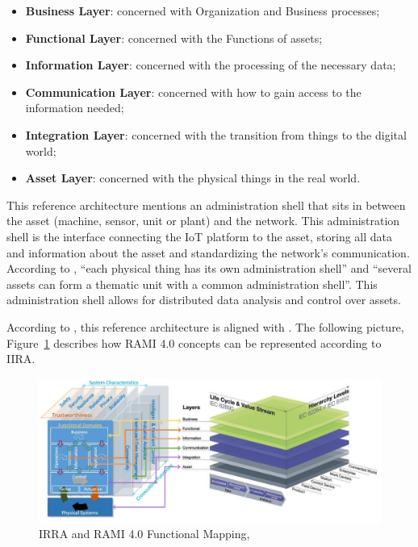 \begin{itemize}
    \item \textbf{Business Layer}: concerned with Organization and Business processes;
    \item \textbf{Functional Layer}: concerned with the Functions of assets;
    \item \textbf{Information Layer}: concerned with the processing of the necessary data; 
    \item \textbf{Communication Layer}: concerned with how to gain access to the information needed;
    \item \textbf{Integration Layer}: concerned with the transition from things to the digital world;
    \item \textbf{Asset Layer}: concerned with the physical things in the real world.
\end{itemize}

This reference architecture mentions an administration shell that sits in between the asset (machine, sensor, unit or plant) and the network. This administration shell is the interface connecting the \gls{IoT} platform to the asset, storing all data and information about the asset and standardizing the network's communication. According to \cite{rami2}, ``each physical thing has its own administration shell'' and ``several assets can form a thematic unit with a common administration shell''. This administration shell allows for distributed data analysis and control over assets. 

According to \cite{iira-inter-rami}, this reference architecture is aligned with . The following picture, Figure~\ref{fig:stateofart:arch:rami:mapping} describes how RAMI 4.0 concepts can be represented according to IIRA.

\begin{figure}[H]
    \centering
    \includegraphics[scale=0.35]{assets/figures/iira-rami-mapping.png}
    \caption[IIRA and RAMI 4.0 Functional Mapping]{IRRA and RAMI 4.0 Functional Mapping, \cite{iira-inter-rami}}
    \label{fig:stateofart:arch:rami:mapping}
\end{figure}

